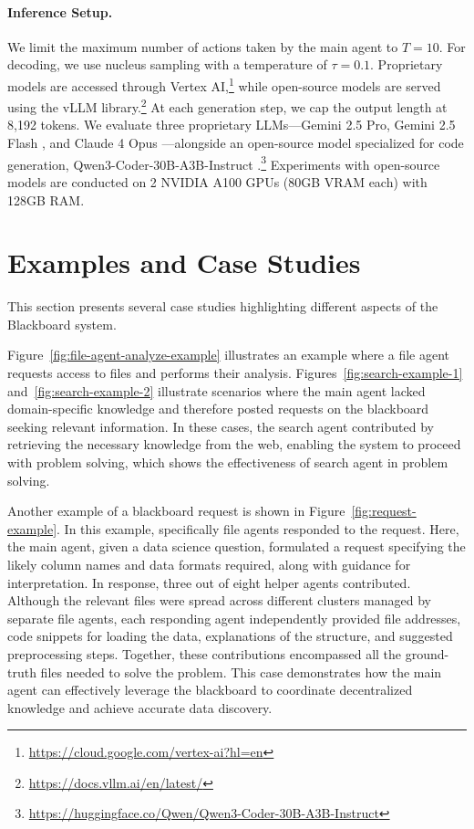 \paragraph{Inference Setup.} We limit the maximum number of actions taken by the main agent to $T = 10$. For decoding, we use nucleus sampling \citep{Holtzman2020The} with a temperature of $\tau = 0.1$. Proprietary models are accessed through Vertex AI,\footnote{\url{https://cloud.google.com/vertex-ai?hl=en}} while open-source models are served using the vLLM library.\footnote{\url{https://docs.vllm.ai/en/latest/}} At each generation step, we cap the output length at 8,192 tokens. We evaluate three proprietary LLMs—Gemini 2.5 Pro, Gemini 2.5 Flash \citep{comanici2025gemini25pushingfrontier}, and Claude 4 Opus \citep{anthropic2025claude4}—alongside an open-source model specialized for code generation, Qwen3-Coder-30B-A3B-Instruct \citep{qwen3technicalreport}.\footnote{\url{https://huggingface.co/Qwen/Qwen3-Coder-30B-A3B-Instruct}} Experiments with open-source models are conducted on 2 NVIDIA A100 GPUs (80GB VRAM each) with 128GB RAM.

\newpage
\section{Examples and Case Studies}
\label{app:case-study}


This section presents several case studies highlighting different aspects of the Blackboard system.

Figure~\ref{fig:file-agent-analyze-example} illustrates an example where a file agent requests access to files and performs their analysis. Figures~\ref{fig:search-example-1} and~\ref{fig:search-example-2} illustrate scenarios where the main agent lacked domain-specific knowledge and therefore posted requests on the blackboard seeking relevant information. In these cases, the search agent contributed by retrieving the necessary knowledge from the web, enabling the system to proceed with problem solving, which shows the effectiveness of search agent in problem solving.

Another example of a blackboard request is shown in Figure~\ref{fig:request-example}. In this example, specifically file agents responded to the request. Here, the main agent, given a data science question, formulated a request specifying the likely column names and data formats required, along with guidance for interpretation. In response, three out of eight helper agents contributed. Although the relevant files were spread across different clusters managed by separate file agents, each responding agent independently provided file addresses, code snippets for loading the data, explanations of the structure, and suggested preprocessing steps. Together, these contributions encompassed all the ground-truth files needed to solve the problem. This case demonstrates how the main agent can effectively leverage the blackboard to coordinate decentralized knowledge and achieve accurate data discovery.

